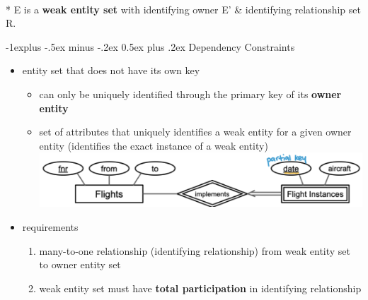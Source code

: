 \documentclass[10pt, landscape]{article}
\makeatletter
\renewcommand{\subsection}{\@startsection{subsection}{2}{0mm}%
  {-1explus -.5ex minus -.2ex}%
  {0.5ex plus .2ex}%
{\normalfont\normalsize\bfseries}}
\makeatother
\begin{document}
\begin{multicols*}{4}
\begin{center}
\begin{multicols}{2}
      \\* E is a \textbf{weak entity set} 
      with identifying owner E' 
      \& identifying relationship set R.
    \end{multicols}
  \end{center}

  \subsection{Dependency Constraints}
  \begin{itemize}
    \item {} entity set that does not have its own key 
      \begin{itemize}
        \item can only be uniquely identified through the primary key of its \textbf{owner entity}
        \item {} set of attributes that uniquely identifies a weak entity for a given owner entity (identifies the exact instance of a weak entity)
          \includegraphics[width=0.95\linewidth]{cs2102-weak-entity-partial-key.png} 
      \end{itemize}
    \item requirements
      \begin{enumerate}
        \item many-to-one relationship (identifying relationship) from weak entity set to owner entity set
        \item weak entity set must have \textbf{total participation} in identifying relationship
      \end{enumerate}
  \end{itemize}


\end{multicols*}
\end{document}
